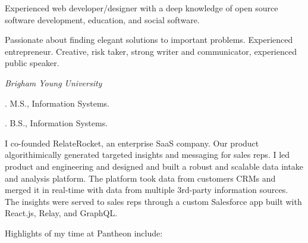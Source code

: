 \documentclass[11pt]{article}
\begin{document}
\medskip

\reversemarginpar

\medskip

\medskip
{}

\noindent Experienced web developer/designer with a deep knowledge of open source software development, education, and social software.

\medskip

\noindent Passionate about finding elegant solutions to important problems. Experienced entrepreneur. Creative, risk taker, strong writer and communicator, experienced public speaker.

\bigskip



\noindent\emph{Brigham Young University \vspace{0.15in}}

. M.S., Information Systems.

. B.S., Information Systems.

\bigskip

\medskip


\noindent I co-founded RelateRocket, an enterprise SaaS company. Our product algorithimically generated targeted insights and messaging for sales reps. I led product and engineering and designed and built a robust and scalable data intake and analysis platform. The platform took data from customers CRMs and merged it in real-time with data from multiple 3rd-party information sources. The insights were served to sales reps through a custom Salesforce app built with React.js, Relay, and GraphQL.

\bigskip


\noindent Highlights of my time at Pantheon include:
\end{document}
